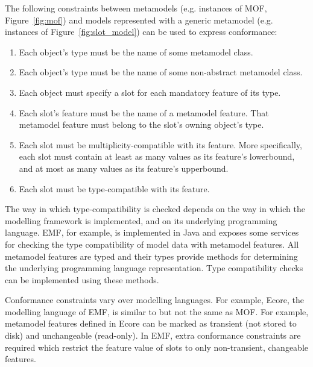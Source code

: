 The following constraints between metamodels (e.g. instances of MOF, Figure~\ref{fig:mof}) and models represented with a generic metamodel (e.g. instances of Figure~\ref{fig:slot_model}) can be used to express conformance:

\begin{enumerate}
	\item Each object's type must be the name of some metamodel class.
	\item Each object's type must be the name of some non-abstract metamodel class.
	\item Each object must specify a slot for each mandatory feature of its type.
	\item Each slot's feature must be the name of a metamodel feature. That metamodel feature must belong to the slot's owning object's type.
	\item Each slot must be multiplicity-compatible with its feature. More specifically, each slot must contain at least as many values as its feature's lowerbound, and at most as many values as its feature's upperbound.
  \item Each slot must be type-compatible with its feature.
\end{enumerate}

The way in which type-compatibility is checked depends on the way in which the modelling framework is implemented, and on its underlying programming language. EMF, for example, is implemented in Java and exposes some services for checking the type compatibility of model data with metamodel features. All metamodel features are typed and their types provide methods for determining the underlying programming language representation. Type compatibility checks can be implemented using these methods.

Conformance constraints vary over modelling languages. For example, Ecore, the modelling language of EMF, is similar to but not the same as MOF. For example, metamodel features defined in Ecore can be marked as transient (not stored to disk) and unchangeable (read-only). In EMF, extra conformance constraints are required which restrict the feature value of slots to only non-transient, changeable features.


